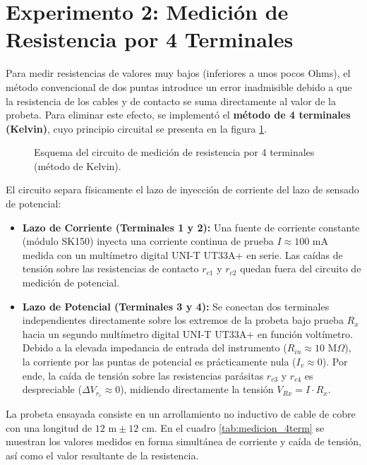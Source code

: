 \section{Experimento 2: Medición de Resistencia por 4 Terminales}
Para medir resistencias de valores muy bajos (inferiores a unos pocos Ohms), el método convencional de dos puntas introduce
un error inadmisible debido a que la resistencia de los cables y de contacto se suma directamente al valor de la probeta.
Para eliminar este efecto, se implementó el \textbf{método de 4 terminales (Kelvin)}, cuyo principio circuital se presenta
en la figura \ref{fig:esquema_4terminales}.

\begin{figure}[!ht]
    \centering
    
    \caption{Esquema del circuito de medición de resistencia por 4 terminales (método de Kelvin).}
    \label{fig:esquema_4terminales}
\end{figure}

El circuito separa físicamente el lazo de inyección de corriente del lazo de sensado de potencial:
\begin{itemize}
    \item \textbf{Lazo de Corriente (Terminales 1 y 2):} Una fuente de corriente constante (módulo SK150) inyecta una corriente continua de prueba $I \approx 100\text{ mA}$ medida con un multímetro digital UNI-T UT33A+ en serie. Las caídas de tensión sobre las resistencias de contacto $r_{c1}$ y $r_{c2}$ quedan fuera del circuito de medición de potencial.
    \item \textbf{Lazo de Potencial (Terminales 3 y 4):} Se conectan dos terminales independientes directamente sobre los extremos de la probeta bajo prueba $R_x$ hacia un segundo multímetro digital UNI-T UT33A+ en función voltímetro. Debido a la elevada impedancia de entrada del instrumento ($R_{in} \approx 10\text{ M}\Omega$), la corriente por las puntas de potencial es prácticamente nula ($I_v \approx 0$). Por ende, la caída de tensión sobre las resistencias parásitas $r_{c3}$ y $r_{c4}$ es despreciable ($\Delta V_{r_{c}} \approx 0$), midiendo directamente la tensión $V_{Rx} = I \cdot R_x$.
\end{itemize}

La probeta ensayada consiste en un arrollamiento no inductivo de cable de cobre con una longitud de $12\text{ m} \pm 12\text{ cm}$. En el cuadro \ref{tab:medicion_4term} se muestran los valores medidos en forma simultánea de corriente y caída de tensión, así como el valor resultante de la resistencia.

